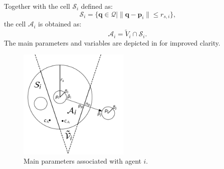         Together with the cell $\mathcal{S}_i$ defined as: 
        \begin{equation}
            \label{eqn:cell_s}
            \mathcal{S}_i = \{\mathbf{q} \in \mathcal{Q} | \| \mathbf{q} - \mathbf{p}_i \| \leq r_{s,i}\}\text{,}
        \end{equation}
        the cell $\mathcal{A}_i$ is obtained as:
        \begin{equation}
            \label{eqn:cell_a}
            \mathcal{A}_i = \tilde{V}_i \cap \mathcal{S}_i \text{.}
        \end{equation}
        The main parameters and variables are depicted in  for improved clarity. 

        \begin{figure}[htbp]
            \centering
            \includegraphics[width=0.48\textwidth, height=0.48\textwidth]{./fig/photos/cells_example.png}
            \caption{
                Main parameters associated with agent $i$.
            }
            \label{fig:cells_example}
        \end{figure}

